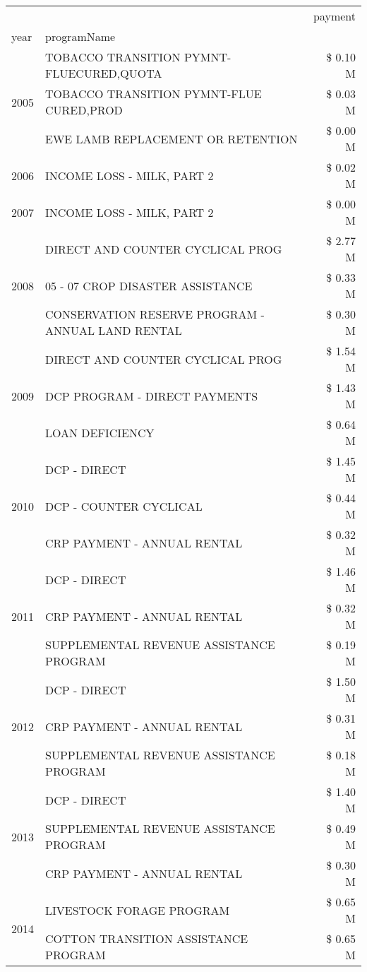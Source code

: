 \begin{tabular}{llr}
\toprule
 &  & payment \\
year & programName &  \\
\midrule
\multirow[t]{3}{*}{2005} & TOBACCO TRANSITION PYMNT-FLUECURED,QUOTA & \$ 0.10 M \\
 & TOBACCO TRANSITION PYMNT-FLUE CURED,PROD & \$ 0.03 M \\
 & EWE LAMB REPLACEMENT OR RETENTION & \$ 0.00 M \\
\cline{1-3}
2006 & INCOME LOSS - MILK, PART 2 & \$ 0.02 M \\
\cline{1-3}
2007 & INCOME LOSS - MILK, PART 2 & \$ 0.00 M \\
\cline{1-3}
\multirow[t]{3}{*}{2008} & DIRECT AND COUNTER CYCLICAL PROG & \$ 2.77 M \\
 & 05 - 07 CROP DISASTER ASSISTANCE & \$ 0.33 M \\
 & CONSERVATION RESERVE PROGRAM - ANNUAL LAND RENTAL & \$ 0.30 M \\
\cline{1-3}
\multirow[t]{3}{*}{2009} & DIRECT AND COUNTER CYCLICAL PROG & \$ 1.54 M \\
 & DCP PROGRAM - DIRECT PAYMENTS & \$ 1.43 M \\
 & LOAN DEFICIENCY & \$ 0.64 M \\
\cline{1-3}
\multirow[t]{3}{*}{2010} & DCP - DIRECT & \$ 1.45 M \\
 & DCP - COUNTER CYCLICAL & \$ 0.44 M \\
 & CRP PAYMENT - ANNUAL RENTAL & \$ 0.32 M \\
\cline{1-3}
\multirow[t]{3}{*}{2011} & DCP - DIRECT & \$ 1.46 M \\
 & CRP PAYMENT - ANNUAL RENTAL & \$ 0.32 M \\
 & SUPPLEMENTAL REVENUE ASSISTANCE PROGRAM & \$ 0.19 M \\
\cline{1-3}
\multirow[t]{3}{*}{2012} & DCP - DIRECT & \$ 1.50 M \\
 & CRP PAYMENT - ANNUAL RENTAL & \$ 0.31 M \\
 & SUPPLEMENTAL REVENUE ASSISTANCE PROGRAM & \$ 0.18 M \\
\cline{1-3}
\multirow[t]{3}{*}{2013} & DCP - DIRECT & \$ 1.40 M \\
 & SUPPLEMENTAL REVENUE ASSISTANCE PROGRAM & \$ 0.49 M \\
 & CRP PAYMENT - ANNUAL RENTAL & \$ 0.30 M \\
\cline{1-3}
\multirow[t]{3}{*}{2014} & LIVESTOCK FORAGE PROGRAM & \$ 0.65 M \\
 & COTTON TRANSITION ASSISTANCE PROGRAM & \$ 0.65 M \\

\end{tabular}
